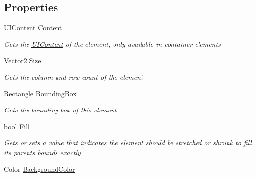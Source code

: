 \subsection*{Properties}
\begin{DoxyCompactItemize}
\item 
\hyperlink{class_midnight_blue_1_1_engine_1_1_u_i_1_1_u_i_content}{U\+I\+Content} \hyperlink{class_midnight_blue_1_1_engine_1_1_u_i_1_1_u_i_element_a82648add05ebacdf8a2b47317b97e827}{Content}
\begin{DoxyCompactList}\small\item\em Gets the \hyperlink{class_midnight_blue_1_1_engine_1_1_u_i_1_1_u_i_content}{U\+I\+Content} of the element, only available in container elements \end{DoxyCompactList}\item 
Vector2 \hyperlink{class_midnight_blue_1_1_engine_1_1_u_i_1_1_u_i_element_a68f0fdf9795a81e8d67040531e04f63e}{Size}
\begin{DoxyCompactList}\small\item\em Gets the column and row count of the element \end{DoxyCompactList}\item 
Rectangle \hyperlink{class_midnight_blue_1_1_engine_1_1_u_i_1_1_u_i_element_a28bf82f271376162bab18a758871aca1}{Bounding\+Box}
\begin{DoxyCompactList}\small\item\em Gets the bounding box of this element \end{DoxyCompactList}\item 
bool \hyperlink{class_midnight_blue_1_1_engine_1_1_u_i_1_1_u_i_element_a49f08f416fb8b80bc0fd09d8c7e5d77c}{Fill}
\begin{DoxyCompactList}\small\item\em Gets or sets a value that indicates the element should be stretched or shrunk to fill its parents bounds exactly \end{DoxyCompactList}\item 
Color \hyperlink{class_midnight_blue_1_1_engine_1_1_u_i_1_1_u_i_element_ae6b8bade95c87535e03228f2d0277b21}{Background\+Color}

\end{DoxyCompactItemize}
